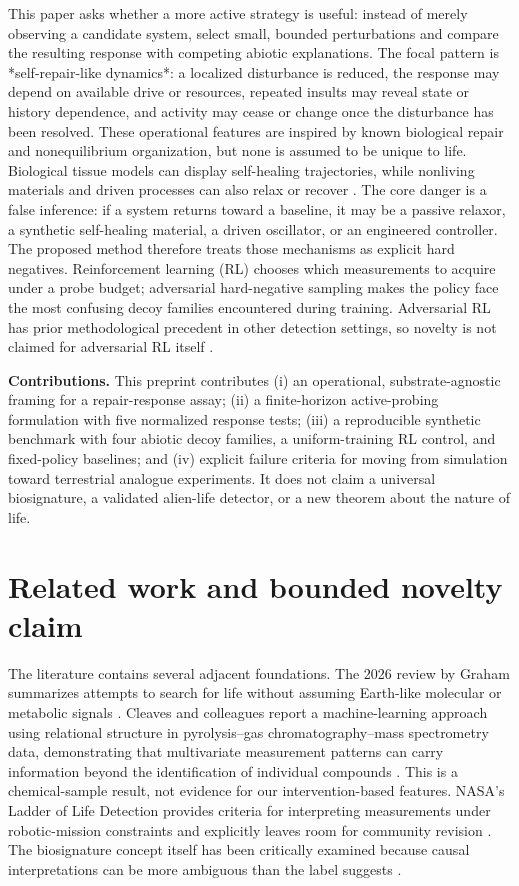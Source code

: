 \documentclass[11pt]{article}
\begin{document}
This paper asks whether a more active strategy is useful: instead of merely observing a candidate system, select small, bounded perturbations and compare the resulting response with competing abiotic explanations. The focal pattern is *self-repair-like dynamics*: a localized disturbance is reduced, the response may depend on available drive or resources, repeated insults may reveal state or history dependence, and activity may cease or change once the disturbance has been resolved. These operational features are inspired by known biological repair and nonequilibrium organization, but none is assumed to be unique to life. Biological tissue models can display self-healing trajectories, while nonliving materials and driven processes can also relax or recover \citep{Suki2020SelfHealing,Youk2026NonEquilibrium}.
The core danger is a false inference: if a system returns toward a baseline, it may be a passive relaxor, a synthetic self-healing material, a driven oscillator, or an engineered controller. The proposed method therefore treats those mechanisms as explicit hard negatives. Reinforcement learning (RL) chooses which measurements to acquire under a probe budget; adversarial hard-negative sampling makes the policy face the most confusing decoy families encountered during training. Adversarial RL has prior methodological precedent in other detection settings, so novelty is not claimed for adversarial RL itself \citep{Tong2020AdversarialRL}.

\textbf{Contributions.} This preprint contributes (i) an operational, substrate-agnostic framing for a repair-response assay; (ii) a finite-horizon active-probing formulation with five normalized response tests; (iii) a reproducible synthetic benchmark with four abiotic decoy families, a uniform-training RL control, and fixed-policy baselines; and (iv) explicit failure criteria for moving from simulation toward terrestrial analogue experiments. It does not claim a universal biosignature, a validated alien-life detector, or a new theorem about the nature of life.

\section{Related work and bounded novelty claim}
The literature contains several adjacent foundations. The 2026 review by Graham summarizes attempts to search for life without assuming Earth-like molecular or metabolic signals \citep{Graham2026Agnostic}. Cleaves and colleagues report a machine-learning approach using relational structure in pyrolysis--gas chromatography--mass spectrometry data, demonstrating that multivariate measurement patterns can carry information beyond the identification of individual compounds \citep{Cleaves2023MLBiosignature}. This is a chemical-sample result, not evidence for our intervention-based features. NASA's Ladder of Life Detection provides criteria for interpreting measurements under robotic-mission constraints and explicitly leaves room for community revision \citep{Neveu2018Ladder}. The biosignature concept itself has been critically examined because causal interpretations can be more ambiguous than the label suggests \citep{Malaterre2023Biosignature}.
\end{document}
